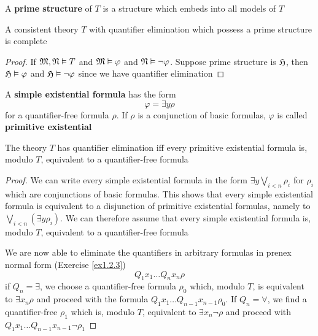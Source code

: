 \documentclass[11pt]{article}
\begin{document}
A \textbf{prime structure} of \(T\) is a structure which embeds into all models of
\(T\)

\begin{lemma}[]
\label{lemma3.2.2}
A consistent theory \(T\) with quantifier elimination which possess a prime
structure is complete
\end{lemma}

\begin{proof}
If \(\mathfrak{M},\mathfrak{N}\vDash T\) and \(\mathfrak{M}\vDash\varphi\) and
\(\mathfrak{N}\vDash\neg\varphi\). Suppose prime structure is \(\mathfrak{H}\), then \(\mathfrak{H}\vDash\varphi\) and \(\mathfrak{H}\vDash\neg\varphi\) since we have quantifier elimination
\end{proof}

\begin{definition}[]
A \textbf{simple existential formula} has the form
\begin{equation*}
\varphi=\exists y\rho
\end{equation*}
for a quantifier-free formula \(\rho\). If \(\rho\) is a conjunction of basic formulas, \(\varphi\)
is called \textbf{primitive existential}
\end{definition}

\begin{lemma}[]
\label{lemma3.2.4}
The theory \(T\) has quantifier elimination iff every primitive existential
formula is, modulo \(T\), equivalent to a quantifier-free formula
\end{lemma}

\begin{proof}
We can write every simple existential formula in the form \(\exists y\bigvee_{i<n}\rho_i\) for \(\rho_i\) which are
conjunctions of basic formulas. This shows that every simple existential formula is equivalent to
a disjunction of primitive existential formulas, namely to \(\bigvee_{i<n}(\exists y\rho_i)\). We can therefore
assume that every simple existential formula is, modulo \(T\), equivalent to a quantifier-free
formula

We are now able to eliminate the quantifiers in arbitrary formulas in prenex normal form
(Exercise \ref{ex1.2.3})
\begin{equation*}
Q_1x_1\dots Q_nx_n\rho
\end{equation*}
if \(Q_n=\exists\), we choose a quantifier-free formula \(\rho_0\) which,
modulo \(T\), is equivalent to \(\exists x_n\rho\) and proceed with the
formula \(Q_1x_1\dots Q_{n-1}x_{n-1}\rho_0\). If \(Q_n=\forall\), we
find a quantifier-free \(\rho_1\) which is, modulo \(T\), equivalent to
\(\exists x_n\neg\rho\) and proceed with \(Q_1x_1\dots Q_{n-1}x_{n-1}\neg\rho_1\)
\end{proof}
\end{document}
